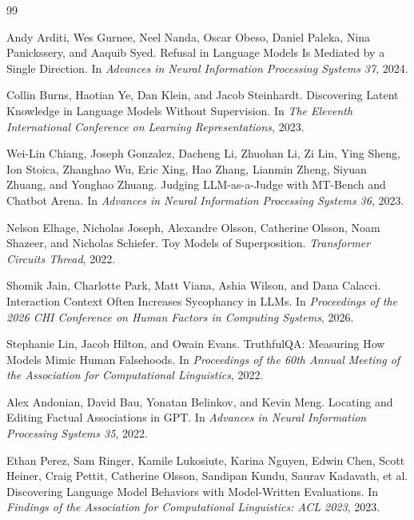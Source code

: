\documentclass[11pt]{article}
\begin{document}
\begin{thebibliography}{99}

Andy Arditi, Wes Gurnee, Neel Nanda, Oscar Obeso, Daniel Paleka, Nina Panickssery, and Aaquib Syed.
\newblock Refusal in Language Models Is Mediated by a Single Direction.
\newblock In \emph{Advances in Neural Information Processing Systems 37}, 2024.

Collin Burns, Haotian Ye, Dan Klein, and Jacob Steinhardt.
\newblock Discovering Latent Knowledge in Language Models Without Supervision.
\newblock In \emph{The Eleventh International Conference on Learning Representations}, 2023.

Wei-Lin Chiang, Joseph Gonzalez, Dacheng Li, Zhuohan Li, Zi Lin, Ying Sheng, Ion Stoica, Zhanghao Wu, Eric Xing, Hao Zhang, Lianmin Zheng, Siyuan Zhuang, and Yonghao Zhuang.
\newblock Judging LLM-as-a-Judge with MT-Bench and Chatbot Arena.
\newblock In \emph{Advances in Neural Information Processing Systems 36}, 2023.

Nelson Elhage, Nicholas Joseph, Alexandre Olsson, Catherine Olsson, Noam Shazeer, and Nicholas Schiefer.
\newblock Toy Models of Superposition.
\newblock \emph{Transformer Circuits Thread}, 2022.

Shomik Jain, Charlotte Park, Matt Viana, Ashia Wilson, and Dana Calacci.
\newblock Interaction Context Often Increases Sycophancy in LLMs.
\newblock In \emph{Proceedings of the 2026 CHI Conference on Human Factors in Computing Systems}, 2026.

Stephanie Lin, Jacob Hilton, and Owain Evans.
\newblock TruthfulQA: Measuring How Models Mimic Human Falsehoods.
\newblock In \emph{Proceedings of the 60th Annual Meeting of the Association for Computational Linguistics}, 2022.

Alex Andonian, David Bau, Yonatan Belinkov, and Kevin Meng.
\newblock Locating and Editing Factual Associations in GPT.
\newblock In \emph{Advances in Neural Information Processing Systems 35}, 2022.

Ethan Perez, Sam Ringer, Kamile Lukosiute, Karina Nguyen, Edwin Chen, Scott Heiner, Craig Pettit, Catherine Olsson, Sandipan Kundu, Saurav Kadavath, et al.
\newblock Discovering Language Model Behaviors with Model-Written Evaluations.
\newblock In \emph{Findings of the Association for Computational Linguistics: ACL 2023}, 2023.


\end{thebibliography}
\end{document}
